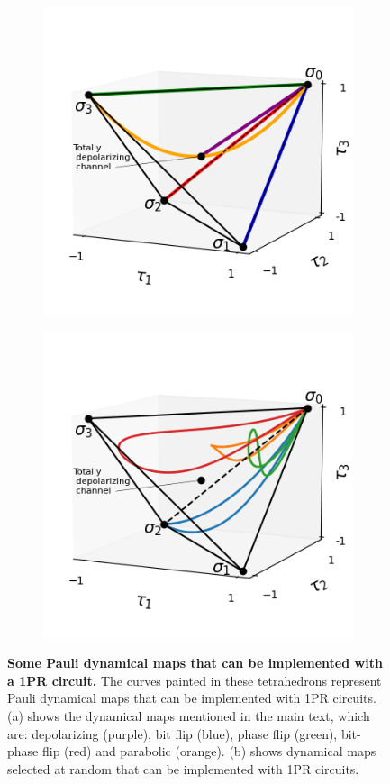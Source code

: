 \documentclass[10pt,letterpaper]{article} %
\begin{document}
\begin{figure}
\captionsetup[subfigure]{justification=centering}
\centering
\begin{subfigure}{.45\textwidth}
  \centering
  \includegraphics[width=.9\linewidth]{images/curvas.png}
   \caption{}
  \label{fig:curves1}
\end{subfigure}%
\begin{subfigure}{.45\textwidth}
  \centering
  \includegraphics[width=.9\linewidth]{images/curvas-azar.png}
  \caption{}
  \label{fig:curves2}
\end{subfigure}
\caption{{\bf Some Pauli dynamical maps that can be implemented with a 1PR circuit.}
The curves painted in these tetrahedrons
represent Pauli dynamical maps that can be implemented with 1PR circuits.
(a) shows the dynamical maps mentioned in the main 
text, which are: depolarizing (purple), bit flip (blue),
phase flip (green), bit-phase flip (red)
and parabolic (orange).
(b) shows dynamical maps selected at random that can be implemented with 1PR 
circuits.}
\label{fig:curves}
\end{figure}
\end{document}
